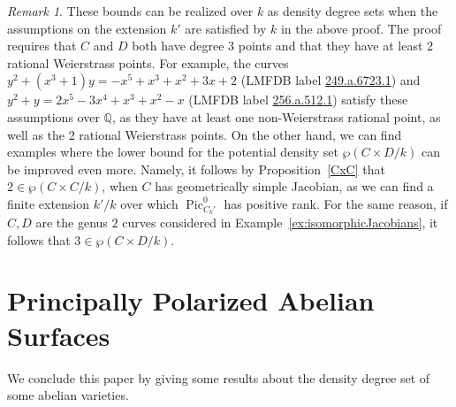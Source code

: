 \documentclass[a4paper,11pt]{amsart}
\theoremstyle{plain}
\theoremstyle{remark}
\newtheorem{remark}[thm]{Remark}
\newcommand{\Pic}{\operatorname{Pic}}
\begin{document}
\begin{remark}
    These bounds can be realized over $k$ as density degree sets when the assumptions on the extension $k'$ are satisfied by $k$ in the above proof. The proof requires that $C$ and $D$ both have degree 3 points and that they have at least 2 rational Weierstrass points. For example, the curves $y^2 + (x^3 + 1)y = -x^5 + x^3 + x^2 + 3x + 2$ (LMFDB label \href{https://www.lmfdb.org/Genus2Curve/Q/249/a/6723/1}{249.a.6723.1}) and $y^2 + y = 2x^5 - 3x^4 + x^3 + x^2 - x$  (LMFDB label \href{https://www.lmfdb.org/Genus2Curve/Q/256/a/512/1}{256.a.512.1}) satisfy these assumptions over $\mathbb{Q}$, as they have at least one non-Weierstrass rational point, as well as the 2 rational Weierstrass points. 
    On the other hand, we can find examples where the lower bound for the potential density set $\wp(C\times D/k)$ can be improved even more. Namely,
     it follows by Proposition~\ref{CxC} that $2\in\wp(C\times C/k)$, when $C$ has geometrically simple Jacobian, as we can find a finite extension $k'/k$ over which $\Pic^0_{C_k'}$ has positive rank. For the same reason, if $C, D$ are the genus $2$ curves considered in Example~\ref{ex:isomorphicJacobians}, it follows that $3\in\wp(C\times D/k)$.
\end{remark}

\section{Principally Polarized Abelian Surfaces}

We conclude this paper by giving some results about the density degree set of some abelian varieties. 
\end{document}
